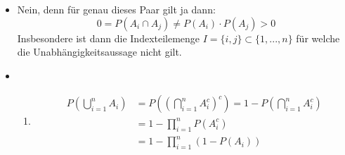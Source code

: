 \documentclass[a4paper]{article}
\author{Bent Mueller}
\newenvironment{Aufgabe}[2][Aufgabe]{\begin{trivlist}
\item[\hskip \labelsep {\bfseries #1}\hskip \labelsep {\bfseries #2.}]}{\end{trivlist}}
\begin{document}
\maketitle
	\begin{Aufgabe}{3}
	\end{Aufgabe}

	\begin{itemize}
		\item[a)] Nein, denn für genau dieses Paar gilt ja dann:
			\[
				0 = P(A_i \cap A_j) \neq P(A_i) \cdot P(A_j) > 0
			\] 
			Insbesondere ist dann die Indexteilemenge $I = \{
				i, j
			\} \subset \{
				1, ..., n
			\} $ für welche die Unabhängigkeitsaussage nicht gilt.

		\item[b)] {
				\begin{enumerate}
					\item[(i)] {
							\begin{align*}
								P \left(
									\bigcup_{i=1}^n A_i
								\right) &= 
								P \left(
									\left(
										\bigcap_{i=1}^n A_i ^{c}
									\right) 
									^{c}
								\right) =
								1 - P \left(
									\bigcap_{i=1}^n A_i ^{c}
								\right) \\
								&= 1 - \prod_{i=1}^{n} P(A_i ^{c}) \\
								&= 1 - \prod_{i=1}^{n} \left(
									1 - P(A_i)
								\right)
							\end{align*}
						}
				\end{enumerate}
			}
	\end{itemize}
\end{document}
